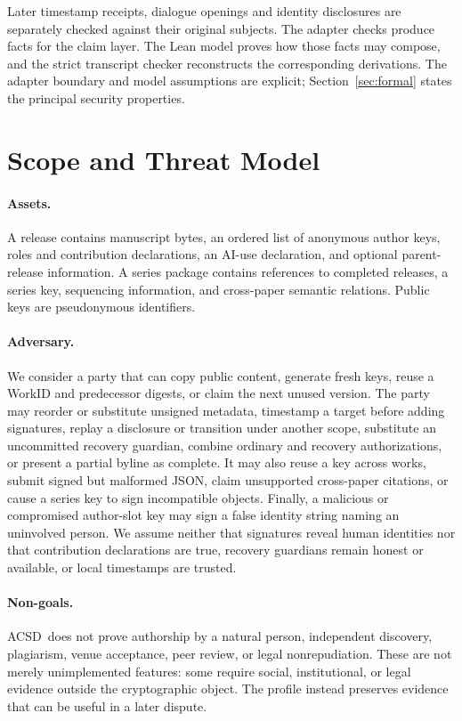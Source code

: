 \documentclass[acmsmall,screen,review,nonacm]{acmart}
\newcommand{\acsd}{\textsc{ACSD}}
\begin{document}
Later timestamp receipts, dialogue openings and identity disclosures are
separately checked against their original subjects. The adapter checks produce
facts for the claim layer. The Lean model proves how those facts may compose,
and the strict transcript checker reconstructs the corresponding derivations.
The adapter boundary and model assumptions are explicit; Section~\ref{sec:formal}
states the principal security properties.



\section{Scope and Threat Model}

\paragraph{Assets.} A release contains manuscript bytes, an ordered list of anonymous author keys, roles and contribution declarations, an AI-use declaration, and optional parent-release information. A series package contains references to completed releases, a series key, sequencing information, and cross-paper semantic relations. Public keys are pseudonymous identifiers.

\paragraph{Adversary.} We consider a party that can copy public content,
generate fresh keys, reuse a WorkID and predecessor digests, or claim the next
unused version. The party may reorder or substitute unsigned metadata,
timestamp a target before adding signatures, replay a disclosure or transition
under another scope, substitute an uncommitted recovery guardian, combine
ordinary and recovery authorizations, or present a partial byline as complete.
It may also reuse a key across works, submit signed but malformed JSON, claim
unsupported cross-paper citations, or cause a series key to sign incompatible
objects. Finally, a malicious or compromised author-slot key may sign a false
identity string naming an uninvolved person. We assume neither that signatures
reveal human identities nor that contribution declarations are true, recovery
guardians remain honest or available, or local timestamps are trusted.

\paragraph{Non-goals.} \acsd\ does not prove authorship by a natural person, independent discovery, plagiarism, venue acceptance, peer review, or legal nonrepudiation. These are not merely unimplemented features: some require social, institutional, or legal evidence outside the cryptographic object. The profile instead preserves evidence that can be useful in a later dispute.
\end{document}
